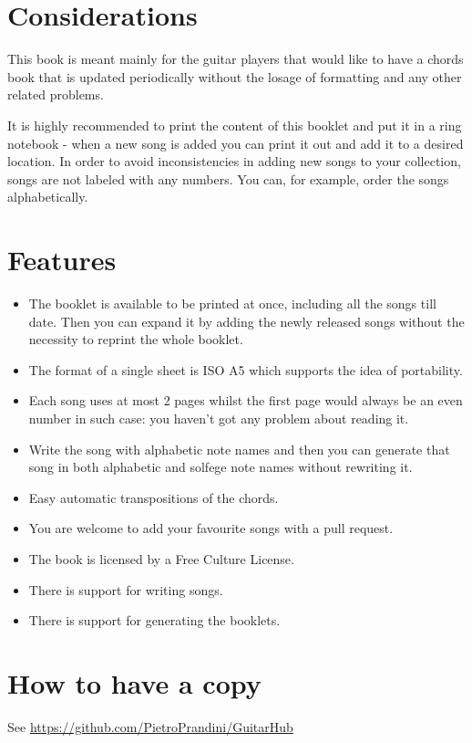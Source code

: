 \section*{Considerations}
This book is meant mainly for the guitar players that would like to have a chords book that is updated periodically without the losage of formatting and any other related problems.\par
It is highly recommended to print the content of this booklet and put it in a ring notebook - when a new song is added you can print it out and add it to a desired location. In order to avoid inconsistencies in adding new songs to your collection, songs are not labeled with any numbers. You can, for example, order the songs alphabetically.\par

\section*{Features}
\begin{itemize}
\item The booklet is available to be printed at once, including all the songs till date. Then you can expand it by adding the newly released songs without the necessity to reprint the whole booklet.
\item The format of a single sheet is ISO A5 which supports the idea of  portability.
\item Each song uses at most 2 pages whilst the first page would always be an even number in such case: you haven't got any problem about reading it.
\item Write the song with alphabetic note names and then you can generate that song in both alphabetic and solfege note names without rewriting it.
\item Easy automatic transpositions of the chords.
\item You are welcome to add your favourite songs with a pull request.
\item The book is licensed by a Free Culture License.
\item There is support for writing songs.
\item There is support for generating the booklets.
\end{itemize}

\section*{How to have a copy}
See \href{https://github.com/PietroPrandini/GuitarHub}{https://github.com/PietroPrandini/GuitarHub}

\begin{center}
\end{center}
